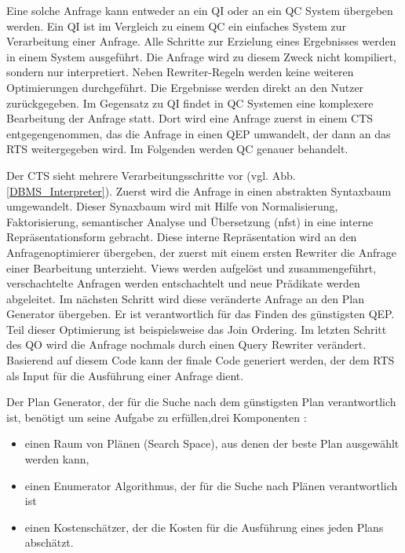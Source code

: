 Eine solche Anfrage kann entweder an ein \ac{QI} oder an ein \ac{QC} System übergeben werden. Ein \ac{QI} ist im Vergleich zu einem \ac{QC} ein einfaches System zur Verarbeitung einer Anfrage. Alle Schritte zur Erzielung eines Ergebnisses werden in einem System ausgeführt. Die Anfrage wird zu diesem Zweck nicht kompiliert, sondern nur interpretiert. Neben Rewriter-Regeln werden keine weiteren Optimierungen durchgeführt. Die Ergebnisse werden direkt an den Nutzer zurückgegeben. Im Gegensatz zu \ac{QI} findet in \ac{QC} Systemen eine komplexere Bearbeitung der Anfrage statt. Dort wird eine Anfrage zuerst in einem \ac{CTS} entgegengenommen, das die Anfrage in einen \ac{QEP} umwandelt, der dann an das \ac{RTS} weitergegeben wird. Im Folgenden werden \ac{QC} genauer behandelt.






Der \ac{CTS} sieht mehrere Verarbeitungsschritte vor (vgl. Abb. \ref{DBMS_Interpreter}). Zuerst wird die Anfrage in einen abstrakten Syntaxbaum umgewandelt. Dieser Synaxbaum wird mit Hilfe von Normalisierung, Faktorisierung, semantischer Analyse und Übersetzung (nfst) in eine interne Repräsentationsform gebracht. Diese interne Repräsentation wird an den Anfragenoptimierer übergeben, der zuerst mit einem ersten Rewriter die Anfrage einer Bearbeitung unterzieht. Views werden aufgelöst und zusammengeführt, verschachtelte Anfragen werden entschachtelt und neue Prädikate werden abgeleitet. Im nächsten Schritt wird diese veränderte Anfrage an den Plan Generator übergeben. Er ist verantwortlich für das Finden des günstigsten \ac{QEP}. Teil dieser Optimierung ist beispielsweise das Join Ordering. Im letzten Schritt des \ac{QO} wird die Anfrage nochmals durch einen Query Rewriter verändert. Basierend auf diesem Code kann der finale Code generiert werden, der dem \ac{RTS} als Input für die Ausführung einer Anfrage dient.


Der Plan Generator, der für die Suche nach dem günstigsten Plan verantwortlich ist, benötigt um seine Aufgabe zu erfüllen,drei Komponenten \cite{chaudhuri1998overview}: 

\begin{itemize}
\item einen Raum von Plänen (Search Space), aus denen der beste Plan ausgewählt werden kann,
\item einen Enumerator Algorithmus, der für die Suche nach Plänen verantwortlich ist
\item einen Kostenschätzer, der die Kosten für die Ausführung eines jeden Plans abschätzt.
\end{itemize}
